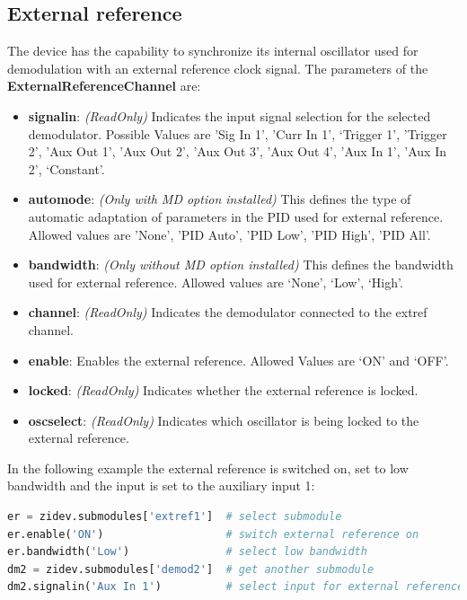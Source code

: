 \documentclass[11pt]{article} %
\begin{document}
\subsection{External reference}
The device has the capability to synchronize its internal oscillator used for demodulation with an external reference clock signal. The parameters of the {\bf ExternalReferenceChannel} are:
\begin{itemize}
\item {\bf signalin}: {\it (ReadOnly)} Indicates the input signal selection for the selected demodulator. Possible Values are 'Sig In 1', 'Curr In 1', `Trigger 1', 'Trigger 2', 'Aux Out 1', 'Aux Out 2', 'Aux Out 3', 'Aux Out 4', 'Aux In 1', 'Aux In 2', `Constant'.
\item {\bf automode}: {\it (Only with MD option installed)} This defines the type of automatic adaptation of parameters in the PID used for external reference. Allowed values are 'None', 'PID Auto', 'PID Low', 'PID High', 'PID All'.
\item {\bf bandwidth}: {\it (Only without MD option installed)} This defines the bandwidth used for external reference. Allowed values are `None', `Low', `High'.
\item {\bf channel}: {\it (ReadOnly)} Indicates the demodulator connected to the extref channel.
\item {\bf enable}: Enables the external reference. Allowed Values are `ON' and `OFF'.
\item {\bf locked}: {\it (ReadOnly)} Indicates whether the external reference is locked.
\item {\bf oscselect}: {\it (ReadOnly)} Indicates which oscillator is being locked to the external reference.
\end{itemize}
In the following example the external reference is switched on, set to low bandwidth and the input is set to the auxiliary input 1:
\begin{lstlisting}[frame=single, language=Python]
er = zidev.submodules['extref1']  # select submodule
er.enable('ON')                   # switch external reference on
er.bandwidth('Low')               # select low bandwidth
dm2 = zidev.submodules['demod2']  # get another submodule
dm2.signalin('Aux In 1')          # select input for external reference
\end{lstlisting}
\end{document}
